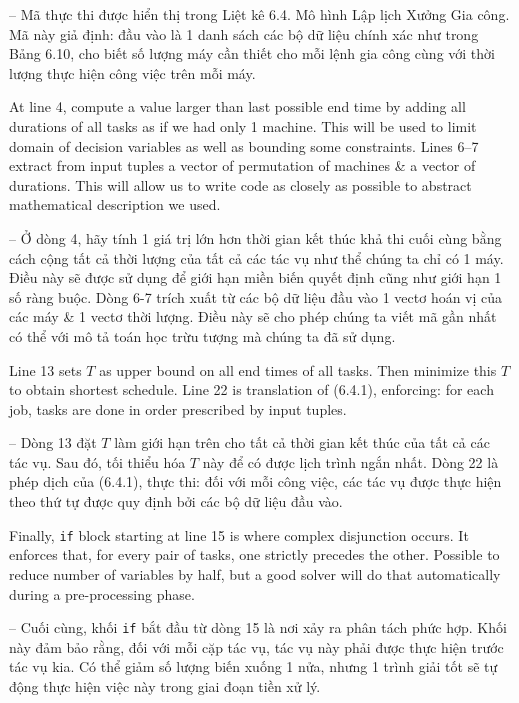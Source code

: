\documentclass{article}
\begin{document}
\begin{itemize}
\begin{itemize}
\begin{itemize}
\begin{itemize}
                -- Mã thực thi được hiển thị trong {\sf Liệt kê 6.4. Mô hình Lập lịch Xưởng Gia công}. Mã này giả định: đầu vào là 1 danh sách các bộ dữ liệu chính xác như trong Bảng 6.10, cho biết số lượng máy cần thiết cho mỗi lệnh gia công cùng với thời lượng thực hiện công việc trên mỗi máy.

                At line 4, compute a value larger than last possible end time by adding all durations of all tasks as if we had only 1 machine. This will be used to limit domain of decision variables as well as bounding some constraints. Lines 6--7 extract from input tuples a vector of permutation of machines \& a vector of durations. This will allow us to write code as closely as possible to abstract mathematical description we used.

                -- Ở dòng 4, hãy tính 1 giá trị lớn hơn thời gian kết thúc khả thi cuối cùng bằng cách cộng tất cả thời lượng của tất cả các tác vụ như thể chúng ta chỉ có 1 máy. Điều này sẽ được sử dụng để giới hạn miền biến quyết định cũng như giới hạn 1 số ràng buộc. Dòng 6-7 trích xuất từ các bộ dữ liệu đầu vào 1 vectơ hoán vị của các máy \& 1 vectơ thời lượng. Điều này sẽ cho phép chúng ta viết mã gần nhất có thể với mô tả toán học trừu tượng mà chúng ta đã sử dụng.

                Line 13 sets $T$ as upper bound on all end times of all tasks. Then minimize this $T$ to obtain shortest schedule. Line 22 is translation of (6.4.1), enforcing: for each job, tasks are done in order prescribed by input tuples.

                -- Dòng 13 đặt $T$ làm giới hạn trên cho tất cả thời gian kết thúc của tất cả các tác vụ. Sau đó, tối thiểu hóa $T$ này để có được lịch trình ngắn nhất. Dòng 22 là phép dịch của (6.4.1), thực thi: đối với mỗi công việc, các tác vụ được thực hiện theo thứ tự được quy định bởi các bộ dữ liệu đầu vào.

                Finally, {\tt if} block starting at line 15 is where complex disjunction occurs. It enforces that, for every pair of tasks, one strictly precedes the other. Possible to reduce number of variables by half, but a good solver will do that automatically during a pre-processing phase.

                -- Cuối cùng, khối {\tt if} bắt đầu từ dòng 15 là nơi xảy ra phân tách phức hợp. Khối này đảm bảo rằng, đối với mỗi cặp tác vụ, tác vụ này phải được thực hiện trước tác vụ kia. Có thể giảm số lượng biến xuống 1 nửa, nhưng 1 trình giải tốt sẽ tự động thực hiện việc này trong giai đoạn tiền xử lý.


\end{itemize}
\end{itemize}
\end{itemize}
\end{itemize}
\end{document}
